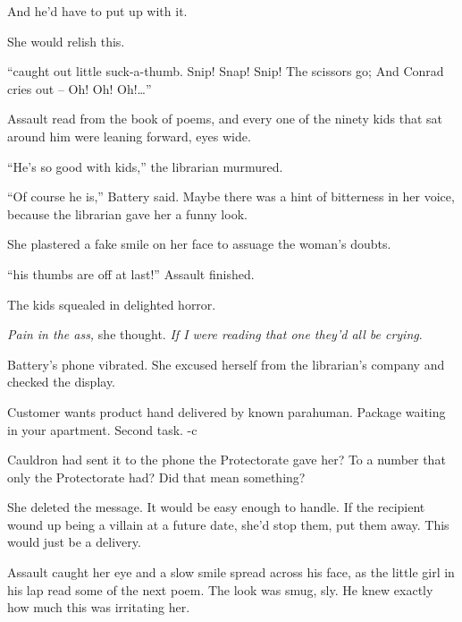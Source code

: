 And he'd have to put up with it.



She would relish this.



\sectionbreak



``\ldotsAnd caught out little suck-a-thumb.
Snip!  Snap!  Snip!  The scissors go;
And Conrad cries out – Oh! Oh! Oh!\ldots''



Assault read from the book of poems, and every one of the ninety kids that sat around him were leaning forward, eyes wide.



``He's so good with kids,'' the librarian murmured.



``Of course he is,'' Battery said.  Maybe there was a hint of bitterness in her voice, because the librarian gave her a funny look.



She plastered a fake smile on her face to assuage the woman's doubts.



``\ldotsboth his thumbs are off at last!''  Assault finished.



The kids squealed in delighted horror.



\emph{Pain in the ass, }she thought.  \emph{If I were reading that one they'd all be crying}.



Battery's phone vibrated.  She excused herself from the librarian's company and checked the display.



Customer wants product hand delivered by known parahuman.  Package waiting in your apartment.  Second task.  -c



Cauldron had sent it to the phone the Protectorate gave her?  To a number that only the Protectorate had?  Did that mean something?



She deleted the message.  It would be easy enough to handle.  If the recipient wound up being a villain at a future date, she'd stop them, put them away.  This would just be a delivery.



Assault caught her eye and a slow smile spread across his face, as the little girl in his lap read some of the next poem.  The look was smug, sly.  He knew exactly how much this was irritating her.



